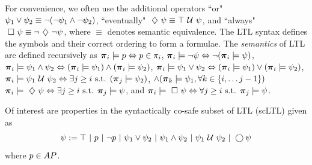 \documentclass{ifacconf}
\begin{document}
    For convenience, we often use the additional operators 
    ``or"  $\psi_1 \vee \psi_2 \equiv  \neg (\neg \psi_1 \wedge \neg \psi_2)$, ``eventually"
    $\ \diamondsuit\  \psi \equiv \top \ \mathcal{U}\  \psi$, and
   ``always"  $\ \square\  \psi \equiv \neg \ \diamondsuit\  \neg \psi$,
    where $\equiv$ denotes semantic equivalence. The LTL syntax defines the symbols and their correct ordering to form a formulae. %
%    
     The {\em semantics} of LTL  are defined recursively as
${\boldsymbol{\pi}}_i \models p   \Leftrightarrow p\in\pi_i$, 
    ${\boldsymbol{\pi}}_i \models \neg \psi  \Leftrightarrow\neg ({\boldsymbol{\pi}}_i \models \psi) $, 
    ${\boldsymbol{\pi}}_i \models \psi_1 \wedge  \psi_2   \Leftrightarrow  ( {\boldsymbol{\pi}}_i \models \psi_1 ) \wedge ( {\boldsymbol{\pi}}_i \models \psi_2 ) $, 
    ${\boldsymbol{\pi}}_i \models \psi_1 \vee  \psi_2   \Leftrightarrow  ( {\boldsymbol{\pi}}_i \models \psi_1 ) \vee ( {\boldsymbol{\pi}}_i \models \psi_2 ) $, 
    ${\boldsymbol{\pi}}_i \models  \psi_1 \ \mathcal{U}\  \psi_2  \Leftrightarrow \exists j \geq i \text{ s.t. } ({\boldsymbol{\pi}}_j \models \psi_2 ) $, 
    $  \wedge ({\boldsymbol{\pi}}_k \models \psi_1, \forall k \in \{i, \ldots j-1\})$
    ${\boldsymbol{\pi}}_i \models \ \diamondsuit\  \psi   \Leftrightarrow \exists j \geq i \text{ s.t. }{\boldsymbol{\pi}}_j \models \psi $, and 
    ${\boldsymbol{\pi}}_i \models \ \square\  \psi   \Leftrightarrow  \forall j \geq i \text{ s.t. }{\boldsymbol{\pi}}_j \models \psi$.



Of interest are properties in the syntactically co-safe subset of LTL (scLTL) given as
    \begin{equation}\label{eq:scLTL}
     \psi :=  \True \ |\ p \ |\ \notltl p \ |\ \psi_1 \vee\psi_2  \ |\ \psi_1 \andltl \psi_2 \ |\ \psi_1 \Until \psi_2 \ |\ \Next \psi
    \end{equation}     where $p\in AP$.
     
\end{document}
